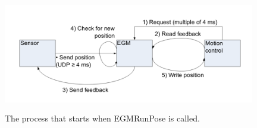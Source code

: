 \documentclass{cslthse-msc}
\begin{document}
\begin{figure}[H]
\vspace{0.5cm}
    \centering
    \includegraphics[width=11cm, height=5cm]{pic_endpoint-process-motion-diagram.png}
    \caption{The process that starts when EGMRunPose is called.}
    \label{fig:runpose_diagram}
\end{figure}
\end{document}
